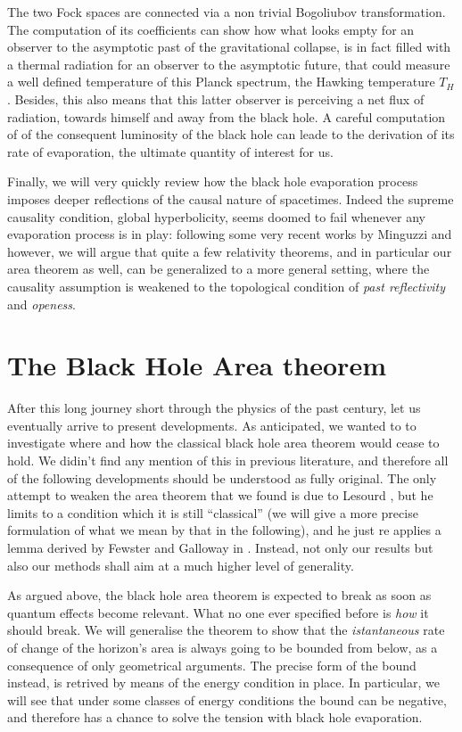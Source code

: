 The two Fock spaces are connected via a non trivial Bogoliubov transformation. The computation of its coefficients can show how what looks empty for an observer to the asymptotic past of the gravitational collapse, is in fact filled with a thermal radiation for an observer to the asymptotic future, that could measure a well defined temperature of this Planck spectrum, the Hawking temperature \(T_H\). Besides, this also means that this latter observer is perceiving a net flux of radiation, towards himself and away from the black hole. A careful computation of of the consequent luminosity of the black hole can leade to the derivation of its rate of evaporation, the ultimate quantity of interest for us.

Finally, we will very quickly review how the black hole evaporation process imposes deeper reflections of the causal nature of spacetimes. Indeed the supreme causality condition, global hyperbolicity, seems doomed to fail whenever any evaporation process is in play: following some very recent works by Minguzzi \cite[]{minguzzi2020gravitational} and \cite[]{minguzzi2019lorentzian} however, we will argue that quite a few relativity theorems, and in particular our area theorem as well, can be generalized to a more general setting, where the causality assumption is weakened to the topological condition of \emph{past reflectivity} and \emph{openess}.

\section{The Black Hole Area theorem}

After this long journey short through the physics of the past century, let us eventually arrive to present developments.
As anticipated, we wanted to to investigate where and how the classical black hole area theorem would cease to hold. We didin't find any mention of this in previous literature, and therefore all of the following developments should be understood as fully original. The only attempt to weaken the area theorem that we found is due to Lesourd \cite[]{lesourd2018remark}, but he limits to a condition which it is still ``classical'' (we will give a more precise formulation of what we mean by that in the following), and he just re applies a lemma derived by Fewster and Galloway in \cite[]{fewster2011singularity}. Instead, not only our results but also our methods shall aim at a much higher level of generality.

As argued above, the black hole area theorem is expected to break as soon as quantum effects become relevant. What no one ever specified before is \emph{how} it should break. We will generalise the theorem to show that the \emph{istantaneous} rate of change of the horizon's area is always going to be bounded from below, as a consequence of only geometrical arguments. The precise form of the bound instead, is retrived by means of the energy condition in place. In particular, we will see that under some classes of energy conditions the bound can be negative, and therefore has a chance to solve the tension with black hole evaporation.

